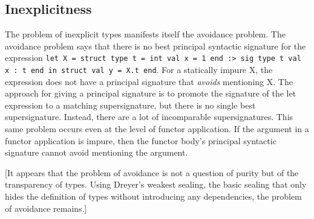 
\subsection{Inexplicitness}

The problem of inexplicit types manifests itself the avoidance problem. The avoidance problem says that there is no best principal syntactic signature for the expression \lstinline{let X = struct type t = int val x = 1 end :> sig type t val x : t end in struct val y = X.t end}. For a statically impure X, the expression does not have a principal signature that \emph{avoids} mentioning X. The approach for giving a principal signature is to promote the signature of the let expression to a matching supersignature, but there is no single best supersignature. Instead, there are a lot of incomparable supersignatures. This same problem occurs even at the level of functor application. If the argument in a functor application is impure, then the functor body's principal syntactic signature cannot avoid mentioning the argument. 

[It appears that the problem of avoidance is not a question of purity but of the transparency of types. Using Dreyer's weakest sealing, the basic sealing that only hides the definition of types without introducing any dependencies, the problem of avoidance remains.]